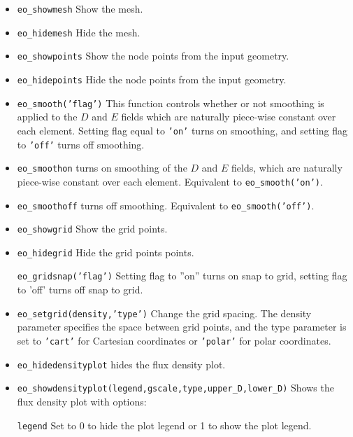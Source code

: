 \begin{itemize}
\item \texttt{eo\_showmesh} Show the mesh.

\item \texttt{eo\_hidemesh} Hide the mesh.

\item \texttt{eo\_showpoints} Show the node points from the input geometry.

\item \texttt{eo\_hidepoints} Hide the node points from the input geometry.

\item \texttt{eo\_smooth('flag')} This function controls whether or not smoothing is
applied to the $D$ and $E$ fields which are naturally piece-wise
constant over each element. Setting flag equal to \texttt{'on'}
turns on smoothing, and setting flag to \texttt{'off'} turns off
smoothing.

\item{\tt eo\_smoothon} turns on smoothing of the $D$ and $E$ fields, which are naturally piece-wise constant over each element. Equivalent to {\tt eo\_smooth('on')}.

\item{\tt eo\_smoothoff} turns off smoothing. Equivalent to {\tt eo\_smooth('off')}.

\item \texttt{eo\_showgrid} Show the grid points.

\item \texttt{eo\_hidegrid} Hide the grid points points.

\texttt{eo\_gridsnap('flag')} Setting flag to ''on'' turns on snap to grid,
setting flag to 'off' turns off snap to grid.

\item \texttt{eo\_setgrid(density,'type')} Change the grid spacing. The density
parameter specifies the space between grid points, and the type
parameter is set to \texttt{'cart'} for Cartesian coordinates or
\texttt{'polar'} for polar coordinates.

\item \texttt{eo\_hidedensityplot} hides the flux density plot.

\item \texttt{eo\_showdensityplot(legend,gscale,type,upper{\_}D,lower{\_}D)} Shows the
flux density plot with options:

\texttt{legend} Set to 0 to hide the plot legend or 1 to show the plot
legend.


\end{itemize}
